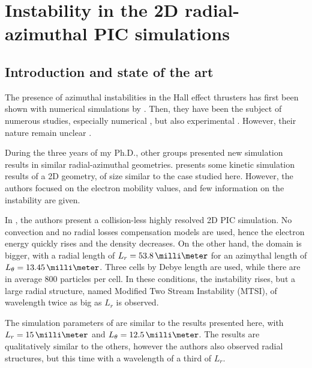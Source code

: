 
\section{Instability in the \ac{2D} radial-azimuthal \ac{PIC} simulations}
  \label{sec-PIC-ECDI}
  
  \subsection{Introduction and state of the art} \label{subsec-indroECDI}
    
    
    The presence of azimuthal instabilities in the Hall effect thrusters has first been shown with numerical simulations by \citet{adam2004}.
    Then, they have been the subject of numerous studies, especially numerical \citep{ducrocq2006,lafleur2016,lafleur2016a,croes2017,croes2018,janhunen2018,taccogna2019}, but also experimental \citep{honore2011,cavalier2013,cavalier2013a}.
    However, their nature remain unclear \citep{boeuf2018}.

    \vspace{1ex}
    During the three years of my Ph.D., other groups presented new simulation results in similar radial-azimuthal geometries.
    \citet{hara2019a} presents some kinetic simulation results of a \ac{2D} geometry, of size similar to the case studied here.
    However, the authors focused on the electron mobility values, and few information on the instability are given.
    
    In \citet{janhunen2018}, the authors present a collision-less highly resolved \ac{2D} \ac{PIC} simulation.
    No convection and no radial losses compensation models are used, hence the electron energy quickly rises and the density decreases.
    On the other hand, the domain is bigger, with a radial length of $L_r = 53.8\,\milli\meter$ for an azimythal length of $L_{\theta} = 13.45 \,\milli\meter$.
    Three cells by Debye length are used, while there are in average 800 particles per cell.
    In these conditions, the instability rises, but a large radial structure, named Modified Two Stream Instability (MTSI), of wavelength twice as big as $L_r$  is observed.
    
    The simulation parameters of \citet{taccogna2019} are similar to the results presented here, with  $L_r = 15\,\milli\meter$ and $L_{\theta} = 12.5 \,\milli\meter$.
    The results are qualitatively similar to the others, however the authors also observed radial structures, but this time with a wavelength of a third of $L_r$.
        
